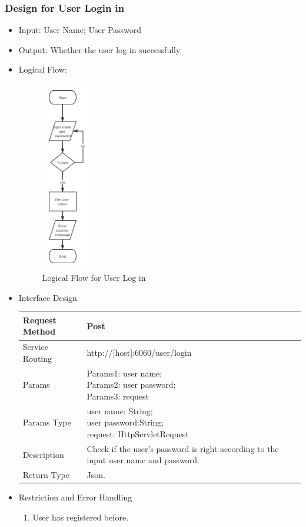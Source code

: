 \documentclass[16pt]{scrreprt}
\begin{document}
\subsubsection{Design for User Login in}
\begin{itemize}
	\item Input: User Name; User Password
	\item Output: Whether the user log in successfully
	\item Logical Flow:
	 \begin{figure}[H]
	\centering
	\includegraphics[width=0.2\textwidth]{diagrams/login.png}
	\caption{Logical Flow for User Log in}
\end{figure}
	\item Interface Design
	\begin{center}
    \begin{tabular}{p{5cm}p{10cm}}
        \hline
	    Request Method & Post\\
        \hline
	    Service Routing &  http://[host]:6060/user/login\\
        \hline
	    Params & \makecell[l]{Params1: user name;\\ Params2: user password;\\ Params3: request}\\ 
        \hline
        Params Type & \makecell[l]{user name: String;\\user password:String;\\ request: HttpServletRequest}\\
        \hline
        Description & Check if the user's password is right according to the input user name and password.\\
        \hline
        Return Type & Json.\\
        \hline
    \end{tabular}
\end{center}
\item Restriction and Error Handling\\
\begin{enumerate}
	\item User has registered before.
\end{enumerate} 
\end{itemize}
\end{document}
